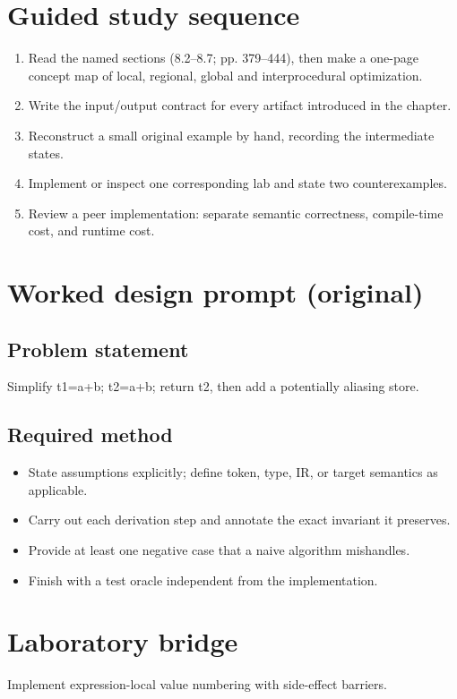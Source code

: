 \documentclass[10pt,letterpaper]{article}
\begin{document}
\section{Guided study sequence}
\begin{enumerate}
\item Read the named sections (8.2--8.7; pp. 379--444), then make a one-page concept map of local, regional, global and interprocedural optimization.
\item Write the input/output contract for every artifact introduced in the chapter.
\item Reconstruct a small original example by hand, recording the intermediate states.
\item Implement or inspect one corresponding lab and state two counterexamples.
\item Review a peer implementation: separate semantic correctness, compile-time cost, and runtime cost.
\end{enumerate}

\section{Worked design prompt (original)}
\subsection{Problem statement}
Simplify t1=a+b; t2=a+b; return t2, then add a potentially aliasing store.
\subsection{Required method}
\begin{itemize}
\item State assumptions explicitly; define token, type, IR, or target semantics as applicable.
\item Carry out each derivation step and annotate the exact invariant it preserves.
\item Provide at least one negative case that a naive algorithm mishandles.
\item Finish with a test oracle independent from the implementation.
\end{itemize}


\section{Laboratory bridge}
Implement expression-local value numbering with side-effect barriers.
\end{document}
